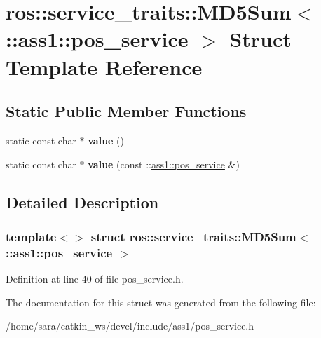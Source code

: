 \hypertarget{structros_1_1service__traits_1_1MD5Sum_3_01_1_1ass1_1_1pos__service_01_4}{}\section{ros\+:\+:service\+\_\+traits\+:\+:M\+D5\+Sum$<$ \+:\+:ass1\+:\+:pos\+\_\+service $>$ Struct Template Reference}
\label{structros_1_1service__traits_1_1MD5Sum_3_01_1_1ass1_1_1pos__service_01_4}
\subsection*{Static Public Member Functions}
\begin{DoxyCompactItemize}
\item 
\mbox{\label{structros_1_1service__traits_1_1MD5Sum_3_01_1_1ass1_1_1pos__service_01_4_af7b71d9a126dbb37a7004701a5162f25}} 
static const char $\ast$ {\bfseries value} ()
\item 
\mbox{\label{structros_1_1service__traits_1_1MD5Sum_3_01_1_1ass1_1_1pos__service_01_4_a197b1246e1ee49136dc46a08749c8b84}} 
static const char $\ast$ {\bfseries value} (const \+::\hyperlink{structass1_1_1pos__service}{ass1\+::pos\+\_\+service} \&)
\end{DoxyCompactItemize}


\subsection{Detailed Description}
\subsubsection*{template$<$$>$\newline
struct ros\+::service\+\_\+traits\+::\+M\+D5\+Sum$<$ \+::ass1\+::pos\+\_\+service $>$}



Definition at line 40 of file pos\+\_\+service.\+h.



The documentation for this struct was generated from the following file\+:\begin{DoxyCompactItemize}
\item 
/home/sara/catkin\+\_\+ws/devel/include/ass1/pos\+\_\+service.\+h\end{DoxyCompactItemize}
